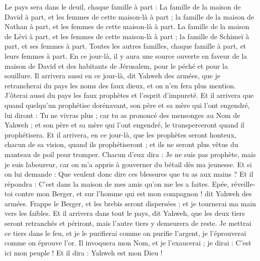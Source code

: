 \begin{multicols}{2}
Le pays sera dans le deuil, chaque famille à part : La famille de la maison de David à part, et les femmes de cette maison-là à part ; la famille de la maison de Nathan à part, et les femmes de cette maison-là à part.
La famille de la maison de Lévi à part, et les femmes de cette maison-là à part ; la famille de Schimeï à part, et ses femmes à part.
Toutes les autres familles, chaque famille à part, et leurs femmes à part.
\VerseOne{}En ce jour-là, il y aura une source ouverte en faveur de la maison de David et des habitants de Jérusalem, pour le péché et pour la souillure.
Il arrivera aussi en ce jour-là, dit Yahweh des armées, que je retrancherai du pays les noms des faux dieux, et on n'en fera plus mention. J'ôterai aussi du pays les faux prophètes et l'esprit d'impureté.
Et il arrivera que quand quelqu'un prophétise dorénavant, son père et sa mère qui l'ont engendré, lui diront : Tu ne vivras plus ; car tu as prononcé des mensonges au Nom de Yahweh ; et son père et sa mère qui l'ont engendré, le transperceront quand il prophétisera.
Et il arrivera, en ce jour-là, que les prophètes seront honteux, chacun de sa vision, quand ils prophétiseront ; et ils ne seront plus vêtus du manteau de poil pour tromper.
Chacun d'eux dira : Je ne suis pas prophète, mais je suis laboureur, car on m'a appris à gouverner du bétail dès ma jeunesse.
Et si on lui demande : Que veulent donc dire ces blessures que tu as aux mains ? Et il répondra : C'est dans la maison de mes amis qu'on me les a faites.
Epée, réveille-toi contre mon Berger, et sur l'homme qui est mon compagnon ! dit Yahweh des armées. Frappe le Berger, et les brebis seront dispersées ; et je tournerai ma main vers les faibles.
Et il arrivera dans tout le pays, dit Yahweh, que les deux tiers seront retranchés et périront, mais l'autre tiers y demeurera de reste.
Je mettrai ce tiers dans le feu, et je le purifierai comme on purifie l'argent, je l'éprouverai comme on éprouve l'or. Il invoquera mon Nom, et je l'exaucerai ; je dirai : C'est ici mon peuple ! Et il dira : Yahweh est mon Dieu !

\end{multicols}
